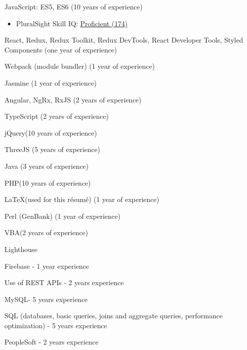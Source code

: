 \documentclass[]{deedy-resume-openfont}
\begin{document}
\descript{}
\begin{tightemize}
\item JavaScript\footnotemark[\value{footnote}]: ES5, ES6 (10 years of experience)
\begin{itemize}
\item PluralSight Skill IQ: \href{https://app.pluralsight.com/profile/alexander-koik-cesto}{\underline{Proficient (174)}}
\end{itemize}
\item React\footnotemark[\value{footnote}], Redux, Redux Toolkit, Redux DevTools, React Developer Tools, Styled Components (one year of experience)
\item Webpack (module bundler) (1 year of experience)
\item Jasmine (1 year of experience)
\item Angular\footnotemark[\value{footnote}], NgRx, RxJS (2 years of experience)
\item TypeScript (2 years of experience)
\item jQuery\footnotemark[\value{footnote}] (10 years of experience)
\item ThreeJS (5 years of experience)
\item Java (3 years of experience)
\item PHP\footnotemark[\value{footnote}] (10 years of experience)
\item \LaTeX \xspace (used for this r\'esum\'e) (1 year of experience)
\item Perl (GenBank) (1 year of experience)
\item VBA\footnotemark[\value{footnote}] (2 years of experience)
\end{tightemize}
\sectionsep

\descript{}
\begin{tightemize}
\item Lighthouse
\end{tightemize}
\sectionsep

\descript{}
\begin{tightemize}
\item Firebase - 1 year experience
\item Use of REST APIs - 2 years experience
\end{tightemize}
\sectionsep

\descript{}
\begin{tightemize}
\item MySQL\footnotemark[\value{footnote}] - 5 years experience
\item SQL (databases, basic queries, joins and aggregate queries, performance optimization) - 5 years experience
\item PeopleSoft - 2 years experience
\end{tightemize}
\sectionsep
\end{document}
